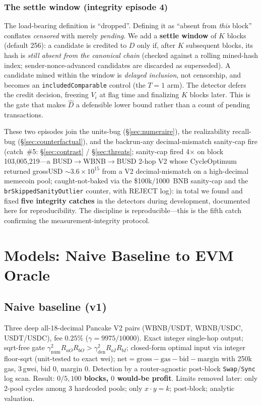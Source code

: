 \documentclass[11pt]{article}
\newcommand{\code}[1]{\texttt{#1}}
\begin{document}
\subsubsection{The settle window (integrity episode 4)}
\label{sec:settle-window}
The load-bearing definition is ``dropped''. Defining it as ``absent from \emph{this}
block'' conflates \emph{censored} with merely \emph{pending}. We add a \textbf{settle
window} of $K$ blocks (default 256): a candidate is credited to $D$ only if, after $K$
subsequent blocks, its hash is \emph{still absent from the canonical chain} (checked
against a rolling mined-hash index; sender-nonce-advanced candidates are discarded as
superseded). A candidate mined within the window is \emph{delayed inclusion}, not
censorship, and becomes an \code{includedComparable} control (the $T=1$ arm). The
detector defers the credit decision, freezing $V_i$ at flag time and finalizing $K$
blocks later. This is the gate that makes $\hat D$ a defensible lower bound rather than a
count of pending transactions.

These two episodes join the units-bug (\S\ref{sec:numeraire}), the realizability
recall-bug (\S\ref{sec:counterfactual}), and the backrun-any decimal-mismatch
sanity-cap fire (catch~\#5: \S\ref{sec:contrast} / \S\ref{sec:threats}; sanity-cap
fired 4$\times$ on block 103{,}005{,}219---a BUSD$\to$WBNB$\to$BUSD 2-hop V2 whose
CycleOptimum returned grossUSD $\sim$$3.6\times10^{15}$ from a V2 decimal-mismatch on
a high-decimal memecoin pool; caught-not-baked via the \$100k$/$1000~BNB sanity-cap
and the \code{brSkippedSanityOutlier} counter, with REJECT log): in total we found
and fixed \textbf{five integrity catches} in the detectors during development,
documented here for reproducibility. The discipline is reproducible---this is the
fifth catch confirming the measurement-integrity protocol.

\section{Models: Naive Baseline to EVM Oracle}

\subsection{Naive baseline (v1)}
Three deep all-18-decimal Pancake V2 pairs (WBNB/USDT, WBNB/USDC, USDT/USDC), fee
$0.25\%$ ($\gamma=9975/10000$). Exact integer single-hop output; sqrt-free gate
$\gamma_{\text{num}}^2 R_{aO} R_{bO} > \gamma_{\text{den}}^2 R_{aI} R_{bI}$;
closed-form optimal input via integer floor-sqrt (unit-tested to exact wei);
$\text{net}=\text{gross}-\text{gas}-\text{bid}-\text{margin}$ with 250k gas, 3\,gwei,
bid $0$, margin $0$. Detection by a router-agnostic post-block \code{Swap}/\code{Sync}
log scan. Result: \textbf{$0/5{,}100$ blocks, $0$ would-be profit}. Limits removed
later: only 2-pool cycles among 3 hardcoded pools; only $x\cdot y=k$; post-block;
analytic valuation.
\end{document}
